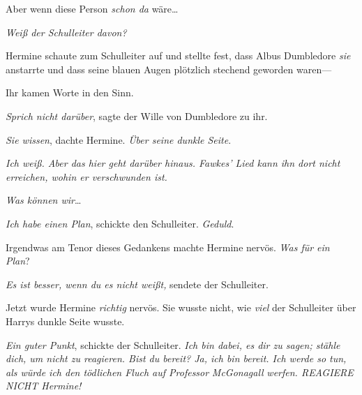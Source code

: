 Aber wenn diese Person \emph{schon da} wäre…

\emph{Weiß der Schulleiter davon?}

Hermine schaute zum Schulleiter auf und stellte fest, dass Albus Dumbledore \emph{sie} anstarrte und dass seine blauen Augen plötzlich stechend geworden waren—

Ihr kamen Worte in den Sinn.

\emph{Sprich nicht darüber}, sagte der Wille von Dumbledore zu ihr.

\emph{Sie wissen}, dachte Hermine. \emph{Über seine dunkle Seite}.

\emph{Ich weiß. Aber das hier geht darüber hinaus. Fawkes’ Lied kann ihn dort nicht erreichen, wohin er verschwunden ist.}

\emph{Was können wir}…

\emph{Ich habe einen Plan}, schickte den Schulleiter. \emph{Geduld}.

Irgendwas am Tenor dieses Gedankens machte Hermine nervös. \emph{Was für ein Plan}?

\emph{Es ist besser, wenn du es nicht weißt,} sendete der Schulleiter.

Jetzt wurde Hermine \emph{richtig} nervös. Sie wusste nicht, wie \emph{viel} der Schulleiter über Harrys dunkle Seite wusste.

\emph{Ein guter Punkt}, schickte der Schulleiter. \emph{Ich bin dabei, es dir zu sagen; stähle dich, um nicht zu reagieren. Bist du bereit? Ja, ich bin bereit. Ich werde so tun, als würde ich den tödlichen Fluch auf Professor} \emph{McGonagall} \emph{werfen. REAGIERE NICHT Hermine!}

